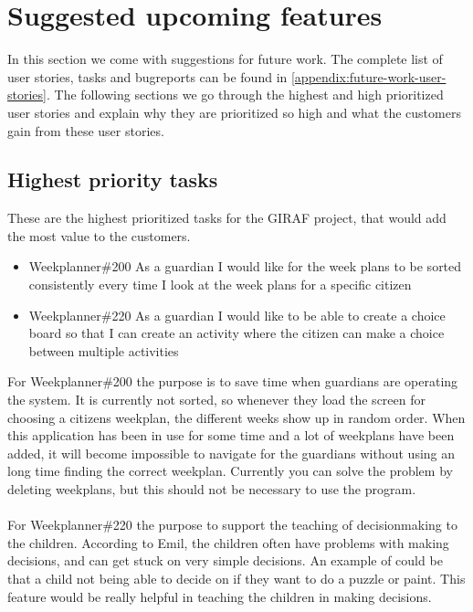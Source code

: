 \section{Suggested upcoming features}
In this section we come with suggestions for future work. 
The complete list of user stories, tasks and bugreports can be found in \autoref{appendix:future-work-user-stories}.
The following sections we go through the highest and high prioritized user stories and explain why they are prioritized so high and what the customers gain from these user stories.

\subsection{Highest priority tasks}\label{highest-priority-tasks}
These are the highest prioritized tasks for the GIRAF project, that would add the most value to the customers.

\begin{itemize}
    \item Weekplanner\#200 As a guardian I would like for the week plans to be sorted consistently every time I look at the week plans for a specific citizen
    \item Weekplanner\#220 As a guardian I would like to be able to create a choice board so that I can create an activity where the citizen can make a choice between multiple activities 
\end{itemize}

\noindent
For Weekplanner\#200 the purpose is to save time when guardians are operating the system. 
It is currently not sorted, so whenever they load the screen for choosing a citizens weekplan, the different weeks show up in random order. 
When this application has been in use for some time and a lot of weekplans have been added, it will become impossible to navigate for the guardians without using an long time finding the correct weekplan.
Currently you can solve the problem by deleting weekplans, but this should not be necessary to use the program.
\\\\
For Weekplanner\#220 the purpose to support the teaching of decisionmaking to the children.
According to Emil, the children often have problems with making decisions, and can get stuck on very simple decisions. 
An example of could be that a child not being able to decide on if they want to do a puzzle or paint.
This feature would be really helpful in teaching the children in making decisions.

